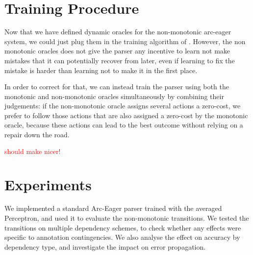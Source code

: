 \documentclass[11pt,letterpaper]{article}
\newcommand{\note}[1]{\textcolor{red}{#1}}
\begin{document}
%
%
%
%
%
%
%
\section{Training Procedure}

Now that we have defined dynamic oracles for the non-monotonic arc-eager
system, we could just plug them in the training algorithm of
\cite{coling2012}.  However, the non monotonic oracles does not give the
parser any incentive to learn not make mistakes that it can potentially recover from
later, even if learning to fix the mistake is harder than learning not to make
it in the first place.

In order to correct for that, we can instead train the parser using both the
monotonic and non-monotonic oracles simultaneously by combining their
judgements: if the non-monotonic oracle assigns several actions a zero-cost,
we prefer to follow those actions that are also assigned a zero-cost by the
monotonic oracle, because these actions can lead to the best outcome without
relying on a repair down the road.

\note{should make nicer!}


\section{Experiments}

We implemented a standard Arc-Eager parser trained with the averaged Perceptron,
and used it to evaluate the non-monotonic transitions. We tested the transitions on
multiple dependency schemes, to check whether any effects were specific to annotation
contingencies. We also analyse the effect on accuracy by dependency type, and
investigate the impact on error propagation.
\end{document}
